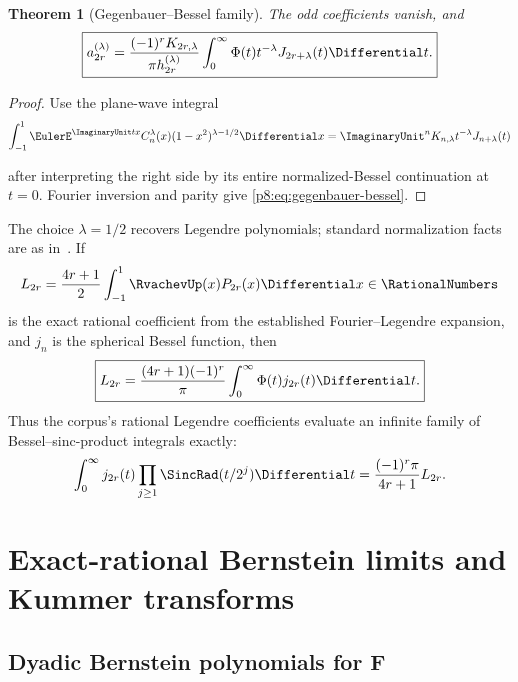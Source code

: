 \documentclass[11pt]{article}
\newtheorem{theorem}{Theorem}[section]
\theoremstyle{definition}
\theoremstyle{remark}
\begin{document}
\begin{theorem}[Gegenbauer--Bessel family]
\label{p8:thm:gegenbauer-bessel}
The odd coefficients vanish, and
\begin{equation}
 \boxed{\displaystyle
 a_{2r}^{(\lambda)}=
 \frac{(-1)^rK_{2r,\lambda}}{\pi h_{2r}^{(\lambda)}}
 \int_0^\infty
 \Phi(t)t^{-\lambda}J_{2r+\lambda}(t)\Differential t.}            \label{p8:eq:gegenbauer-bessel}
\end{equation}
\end{theorem}

\begin{proof}
Use the plane-wave integral
\[
 \int_{-1}^{1}\EulerE^{\ImaginaryUnit tx}C_n^\lambda(x)
 (1-x^2)^{\lambda-1/2}\Differential x
 =\ImaginaryUnit^nK_{n,\lambda}t^{-\lambda}J_{n+\lambda}(t)
\]

after interpreting the right side by its entire normalized-Bessel
continuation at $t=0$.  Fourier inversion and parity give
\eqref{p8:eq:gegenbauer-bessel}.
\end{proof}

The choice $\lambda=1/2$ recovers Legendre polynomials; standard normalization facts are as in~\cite{p8:szego1975}.  If
\begin{equation}
 L_{2r}=\frac{4r+1}{2}\int_{-1}^{1}\RvachevUp(x)P_{2r}(x)\Differential x \in\RationalNumbers          \label{p8:eq:legendre-coeff}
\end{equation}
is the exact rational coefficient from the established Fourier--Legendre
expansion, and $j_n$ is the spherical Bessel function, then
\begin{equation}
 \boxed{\displaystyle
 L_{2r}=\frac{(4r+1)(-1)^r}{\pi}
 \int_0^\infty\Phi(t)j_{2r}(t)\Differential t.}                   \label{p8:eq:legendre-bessel}
\end{equation}
Thus the corpus's rational Legendre coefficients evaluate an infinite family
of Bessel--sinc-product integrals exactly:
\begin{equation}
 \int_0^\infty j_{2r}(t)
 \prod_{j\ge1}\SincRad(t/2^j)\Differential t
 =\frac{(-1)^r\pi}{4r+1}L_{2r}.                         \label{p8:eq:rational-bessel-integrals}
\end{equation}

\section{Exact-rational Bernstein limits and Kummer transforms}
\label{p8:sec:bernstein}

\subsection{Dyadic Bernstein polynomials for F}
\end{document}
